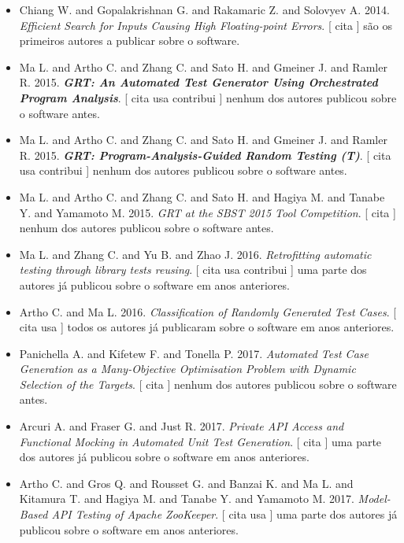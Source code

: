 \begin{itemize}
\item Chiang W. and Gopalakrishnan G. and Rakamaric Z. and Solovyev A.
      2014.
        \textit{ Efficient Search for Inputs Causing High Floating-point Errors}.
      [
          cita
      ]
são os primeiros autores a publicar sobre o software.
\item Ma L. and Artho C. and Zhang C. and Sato H. and Gmeiner J. and Ramler R.
      2015.
        \textbf{\textit{ GRT: An Automated Test Generator Using Orchestrated Program Analysis}}.
      [
          cita
          usa
          contribui
      ]
nenhum dos autores publicou sobre o software antes.
\item Ma L. and Artho C. and Zhang C. and Sato H. and Gmeiner J. and Ramler R.
      2015.
        \textbf{\textit{ GRT: Program-Analysis-Guided Random Testing (T)}}.
      [
          cita
          usa
          contribui
      ]
nenhum dos autores publicou sobre o software antes.
\item Ma L. and Artho C. and Zhang C. and Sato H. and Hagiya M. and Tanabe Y. and Yamamoto M.
      2015.
        \textit{ GRT at the SBST 2015 Tool Competition}.
      [
          cita
      ]
nenhum dos autores publicou sobre o software antes.
\item Ma L. and Zhang C. and Yu B. and Zhao J.
      2016.
        \textit{ Retrofitting automatic testing through library tests reusing}.
      [
          cita
          usa
          contribui
      ]
uma parte dos autores já publicou sobre o software em anos anteriores.
\item Artho C. and Ma L.
      2016.
        \textit{ Classification of Randomly Generated Test Cases}.
      [
          cita
          usa
      ]
todos os autores já publicaram sobre o software em anos anteriores.
\item Panichella A. and Kifetew F. and Tonella P.
      2017.
        \textit{ Automated Test Case Generation as a Many-Objective Optimisation Problem with Dynamic Selection of the Targets}.
      [
          cita
      ]
nenhum dos autores publicou sobre o software antes.
\item Arcuri A. and Fraser G. and Just R.
      2017.
        \textit{ Private API Access and Functional Mocking in Automated Unit Test Generation}.
      [
          cita
      ]
uma parte dos autores já publicou sobre o software em anos anteriores.
\item Artho C. and Gros Q. and Rousset G. and Banzai K. and Ma L. and Kitamura T. and Hagiya M. and Tanabe Y. and Yamamoto M.
      2017.
        \textit{ Model-Based API Testing of Apache ZooKeeper}.
      [
          cita
          usa
      ]
uma parte dos autores já publicou sobre o software em anos anteriores.
\end{itemize}
